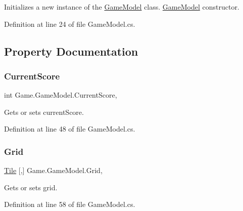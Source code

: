 Initializes a new instance of the \mbox{\hyperlink{class_game_1_1_game_model}{Game\+Model}} class. \mbox{\hyperlink{class_game_1_1_game_model}{Game\+Model}} constructor. 



Definition at line 24 of file Game\+Model.\+cs.



\subsection{Property Documentation}
\mbox{\label{class_game_1_1_game_model_a769c059d4add114f0253064fcc909ddd}} 
\subsubsection{\texorpdfstring{CurrentScore}{CurrentScore}}
{\footnotesize\ttfamily int Game.\+Game\+Model.\+Current\+Score\hspace{0.3cm}{\ttfamily [get]}, {\ttfamily [set]}}



Gets or sets current\+Score. 



Definition at line 48 of file Game\+Model.\+cs.

\mbox{\label{class_game_1_1_game_model_a435126a3c8089719816ae19daf5c1c59}} 
\subsubsection{\texorpdfstring{Grid}{Grid}}
{\footnotesize\ttfamily \mbox{\hyperlink{class_game_1_1_tile}{Tile}} \mbox{[},\mbox{]} Game.\+Game\+Model.\+Grid\hspace{0.3cm}{\ttfamily [get]}, {\ttfamily [set]}}



Gets or sets grid. 



Definition at line 58 of file Game\+Model.\+cs.

\mbox{\label{class_game_1_1_game_model_afc483c3acb6b61666a4d97d25bd9149d}} 
